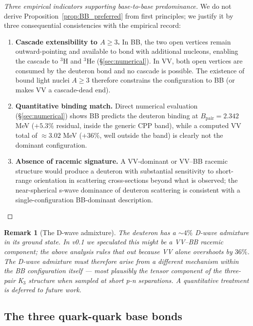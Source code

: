 \documentclass[11pt,letterpaper]{article}
\newtheorem{remark}[theorem]{Remark}
\newcommand{\Bpair}{B_{\mathrm{pair}}}
\begin{document}
\begin{proof}[Three empirical indicators supporting base-to-base predominance]
We do not derive Proposition~\ref{prop:BB_preferred} from first principles; we justify it by three consequential consistencies with the empirical record:
\begin{enumerate}
\item \textbf{Cascade extensibility to $A \geq 3$.} In BB, the two open vertices remain outward-pointing and available to bond with additional nucleons, enabling the cascade to ${}^{3}\mathrm{H}$ and ${}^{3}\mathrm{He}$ (\S\ref{sec:numerical}). In VV, both open vertices are consumed by the deuteron bond and no cascade is possible. The existence of bound light nuclei $A \geq 3$ therefore constrains the configuration to BB (or makes VV a cascade-dead end).
\item \textbf{Quantitative binding match.} Direct numerical evaluation (\S\ref{sec:numerical}) shows BB predicts the deuteron binding at $\Bpair = 2.342$ MeV ($+5.3\%$ residual, inside the generic CPP band), while a computed VV total of $\approx 3.02$ MeV ($+36\%$, well outside the band) is clearly not the dominant configuration.
\item \textbf{Absence of racemic signature.} A VV-dominant or VV--BB racemic structure would produce a deuteron with substantial sensitivity to short-range orientation in scattering cross-sections beyond what is observed; the near-spherical s-wave dominance of deuteron scattering is consistent with a single-configuration BB-dominant description.
\end{enumerate}
\end{proof}

\begin{remark}[The D-wave admixture]
The deuteron has a $\sim 4\%$ D-wave admixture in its ground state. In v0.1 we speculated this might be a VV--BB racemic component; the above analysis rules that out because VV alone overshoots by $36\%$. The D-wave admixture must therefore arise from a different mechanism within the BB configuration itself --- most plausibly the tensor component of the three-pair K$_3$ structure when sampled at short p-n separations. A quantitative treatment is deferred to future work.
\end{remark}

\subsection{The three quark-quark base bonds}
\label{sec:qq_bonds}
\end{document}
